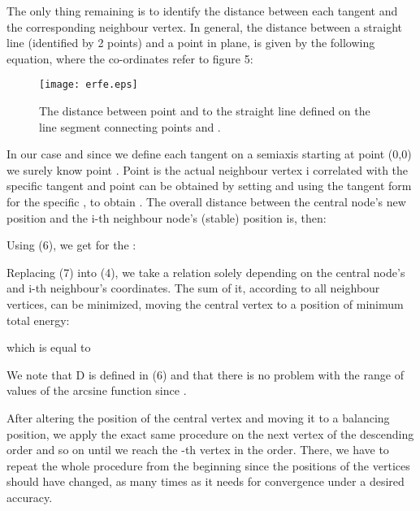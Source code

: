\documentclass[10pt]{article}
\begin{document}
The only thing remaining is to identify the distance between each tangent and the corresponding neighbour vertex. In general, the distance between a straight line (identified by 2 points) and a point in plane, is given by the following equation,  where the co-ordinates refer to figure 5:






\begin{figure}
\begin{center}
\texttt{[image: erfe.eps]}
\end{center}
\caption{The distance between point  and to the straight line defined on the line segment connecting points  and .}
\end{figure}

In our case and since we define each tangent on a semiaxis starting at point (0,0) we surely know point . Point  is the actual neighbour vertex i correlated with the specific tangent and point  can be obtained by setting  and using the tangent form  for the specific , to obtain . The overall distance between the central node's new position and the i-th neighbour node's (stable) position is, then:



Using (6), we get for the :



Replacing (7) into (4), we take a relation solely depending on the central node's and i-th neighbour's coordinates. The sum of it, according to all neighbour vertices, can be minimized, moving the central vertex to a position of minimum total energy:



which is equal to 



We note that D is defined in (6) and that there is no problem with the range of values of the arcsine function since .
 







After altering the position of the central vertex and moving it to a balancing position, we apply the exact same procedure on the next vertex of the descending order and so on until we reach the -th vertex in the order. There, we have to repeat the whole procedure from the beginning since the positions of the vertices should have changed, as many times as it needs for convergence under a desired accuracy.
\end{document}

